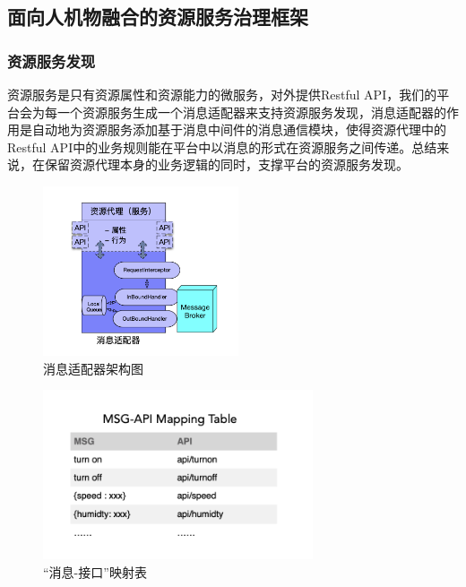 \documentclass[a4paper]{article}
\theoremstyle{definition}
\begin{document}
\subsection{面向人机物融合的资源服务治理框架}
\subsubsection{资源服务发现}
资源服务是只有资源属性和资源能力的微服务，对外提供Restful API，我们的平台会为每一个资源服务生成一个消息适配器来支持资源服务发现，消息适配器的作用是自动地为资源服务添加基于消息中间件的消息通信模块，使得资源代理中的Restful API中的业务规则能在平台中以消息的形式在资源服务之间传递。总结来说，在保留资源代理本身的业务逻辑的同时，支撑平台的资源服务发现。
\begin{figure}[ht]
 \centering
 \includegraphics[height=5cm]{images/msg_adapter.png}
 \caption{消息适配器架构图}
 \label{fig:singleblock}
\end{figure}

 \begin{figure}[ht]
 \centering
 \includegraphics[height=5cm]{images/msg-api_mapping_table.png}
 \caption{“消息-接口”映射表}
 \label{fig:singleblock}
\end{figure}
\end{document}

